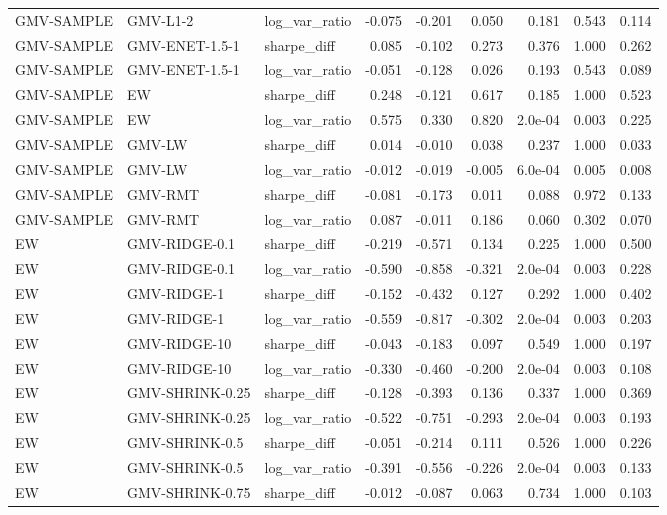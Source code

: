 \begin{table}[t]
{\begin{tabular}{lllrrrrrr}
GMV-SAMPLE & GMV-L1-2 & log\_var\_ratio & -0.075 & -0.201 & 0.050 & 0.181 & 0.543 & 0.114 \\
GMV-SAMPLE & GMV-ENET-1.5-1 & sharpe\_diff & 0.085 & -0.102 & 0.273 & 0.376 & 1.000 & 0.262 \\
GMV-SAMPLE & GMV-ENET-1.5-1 & log\_var\_ratio & -0.051 & -0.128 & 0.026 & 0.193 & 0.543 & 0.089 \\
GMV-SAMPLE & EW & sharpe\_diff & 0.248 & -0.121 & 0.617 & 0.185 & 1.000 & 0.523 \\
GMV-SAMPLE & EW & log\_var\_ratio & 0.575 & 0.330 & 0.820 & 2.0e-04 & 0.003 & 0.225 \\
GMV-SAMPLE & GMV-LW & sharpe\_diff & 0.014 & -0.010 & 0.038 & 0.237 & 1.000 & 0.033 \\
GMV-SAMPLE & GMV-LW & log\_var\_ratio & -0.012 & -0.019 & -0.005 & 6.0e-04 & 0.005 & 0.008 \\
GMV-SAMPLE & GMV-RMT & sharpe\_diff & -0.081 & -0.173 & 0.011 & 0.088 & 0.972 & 0.133 \\
GMV-SAMPLE & GMV-RMT & log\_var\_ratio & 0.087 & -0.011 & 0.186 & 0.060 & 0.302 & 0.070 \\
EW & GMV-RIDGE-0.1 & sharpe\_diff & -0.219 & -0.571 & 0.134 & 0.225 & 1.000 & 0.500 \\
EW & GMV-RIDGE-0.1 & log\_var\_ratio & -0.590 & -0.858 & -0.321 & 2.0e-04 & 0.003 & 0.228 \\
EW & GMV-RIDGE-1 & sharpe\_diff & -0.152 & -0.432 & 0.127 & 0.292 & 1.000 & 0.402 \\
EW & GMV-RIDGE-1 & log\_var\_ratio & -0.559 & -0.817 & -0.302 & 2.0e-04 & 0.003 & 0.203 \\
EW & GMV-RIDGE-10 & sharpe\_diff & -0.043 & -0.183 & 0.097 & 0.549 & 1.000 & 0.197 \\
EW & GMV-RIDGE-10 & log\_var\_ratio & -0.330 & -0.460 & -0.200 & 2.0e-04 & 0.003 & 0.108 \\
EW & GMV-SHRINK-0.25 & sharpe\_diff & -0.128 & -0.393 & 0.136 & 0.337 & 1.000 & 0.369 \\
EW & GMV-SHRINK-0.25 & log\_var\_ratio & -0.522 & -0.751 & -0.293 & 2.0e-04 & 0.003 & 0.193 \\
EW & GMV-SHRINK-0.5 & sharpe\_diff & -0.051 & -0.214 & 0.111 & 0.526 & 1.000 & 0.226 \\
EW & GMV-SHRINK-0.5 & log\_var\_ratio & -0.391 & -0.556 & -0.226 & 2.0e-04 & 0.003 & 0.133 \\
EW & GMV-SHRINK-0.75 & sharpe\_diff & -0.012 & -0.087 & 0.063 & 0.734 & 1.000 & 0.103 \\

\end{tabular}}
\end{table}
